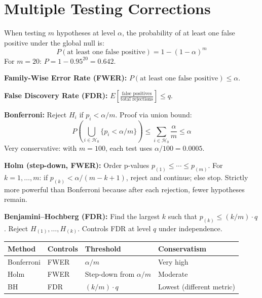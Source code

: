 \documentclass[11pt,a4paper]{article}
\begin{document}
\section{Multiple Testing Corrections}
\label{sec:multiple}

\begin{formaldef}
When testing $m$ hypotheses at level $\alpha$, the probability of at least one false positive under the global null is:
\[
P(\text{at least one false positive}) = 1 - (1-\alpha)^m
\]
For $m = 20$: $P = 1 - 0.95^{20} = 0.642$.

\medskip
\textbf{Family-Wise Error Rate (FWER):} $P(\text{at least one false positive}) \leq \alpha$.

\textbf{False Discovery Rate (FDR):} $E\!\left[\frac{\text{false positives}}{\text{total rejections}}\right] \leq q$.

\medskip
\textbf{Bonferroni:} Reject $H_i$ if $p_i < \alpha/m$. Proof via union bound:
\[
P\!\left(\bigcup_{i \in \mathcal{H}_0}\{p_i < \alpha/m\}\right) \leq \sum_{i \in \mathcal{H}_0} \frac{\alpha}{m} \leq \alpha
\]
Very conservative: with $m=100$, each test uses $\alpha/100 = 0.0005$.

\medskip
\textbf{Holm (step-down, FWER):} Order p-values $p_{(1)} \leq \cdots \leq p_{(m)}$. For $k = 1, \ldots, m$: if $p_{(k)} < \alpha/(m-k+1)$, reject and continue; else stop. Strictly more powerful than Bonferroni because after each rejection, fewer hypotheses remain.

\medskip
\textbf{Benjamini--Hochberg (FDR):} Find the largest $k$ such that $p_{(k)} \leq (k/m) \cdot q$. Reject $H_{(1)}, \ldots, H_{(k)}$. Controls FDR at level $q$ under independence.

\medskip
\begin{tabular}{@{}llll@{}}
\toprule
Method & Controls & Threshold & Conservatism \\
\midrule
Bonferroni & FWER & $\alpha/m$ & Very high \\
Holm & FWER & Step-down from $\alpha/m$ & Moderate \\
BH & FDR & $(k/m) \cdot q$ & Lowest (different metric) \\
\bottomrule
\end{tabular}
\end{formaldef}

\vspace{8pt}
\end{document}
